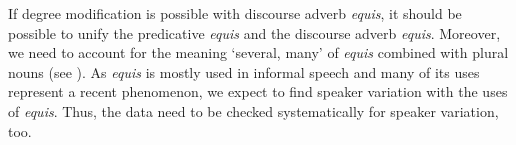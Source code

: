 \documentclass[output=paper
,modfonts
,nonflat]{langsci/langscibook}
\begin{document}
If degree modification is possible with discourse adverb \textit{equis}, it should be possible to unify the predicative \textit{equis} and the discourse adverb \textit{equis}. Moreover, we need to account for the meaning ‘several, many’ of \textit{equis} combined with plural nouns (see ).
As \textit{equis} is mostly used in informal speech and many of its uses represent a recent phenomenon, we expect to find speaker variation with the uses of \textit{equis}. Thus, the data need to be checked systematically for speaker variation, too.


\sloppy
\printbibliography[heading=subbibliography,notkeyword=this]
\end{document}

